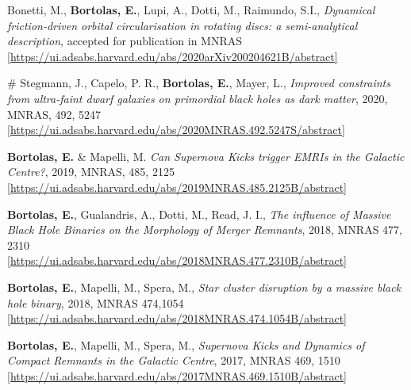 \begin{etaremune}

\item   Bonetti, M., \textbf{Bortolas, E.}, Lupi, A., Dotti, M., Raimundo, S.I., { \it Dynamical friction-driven orbital circularisation in rotating discs: a semi-analytical description}, accepted for publication in MNRAS \\ \href{https://ui.adsabs.harvard.edu/abs/2020arXiv200204621B/abstract}{\scriptsize [https://ui.adsabs.harvard.edu/abs/2020arXiv200204621B/abstract]}

\item  \# Stegmann, J., Capelo, P. R.,  {\bf Bortolas, E.}, Mayer, L., { \it Improved constraints from ultra-faint dwarf galaxies on primordial black holes as dark matter}, 2020, MNRAS, 492, 5247\\ \href{https://ui.adsabs.harvard.edu/abs/2020MNRAS.492.5247S/abstract}{\scriptsize [https://ui.adsabs.harvard.edu/abs/2020MNRAS.492.5247S/abstract]}

\item {\bf Bortolas, E.} \& Mapelli, M. { \it Can Supernova Kicks trigger EMRIs in the Galactic Centre?}, 2019, MNRAS, 485, 2125 \\ \href{https://ui.adsabs.harvard.edu/abs/2019MNRAS.485.2125B/abstract}{\scriptsize [https://ui.adsabs.harvard.edu/abs/2019MNRAS.485.2125B/abstract]}

\item {\bf Bortolas, E.}, Gualandris, A., Dotti, M., Read, J. I., { \it The influence of Massive Black Hole Binaries on the Morphology of Merger Remnants},  2018, MNRAS 477, 2310 \\ \href{https://ui.adsabs.harvard.edu/abs/2018MNRAS.477.2310B/abstract}{\scriptsize [https://ui.adsabs.harvard.edu/abs/2018MNRAS.477.2310B/abstract]}

\item {\bf Bortolas, E.}, Mapelli, M., Spera, M., { \it Star cluster disruption by a massive black hole binary}, 2018, MNRAS 474,1054 \\ \href{https://ui.adsabs.harvard.edu/abs/2018MNRAS.474.1054B/abstract}{\scriptsize [https://ui.adsabs.harvard.edu/abs/2018MNRAS.474.1054B/abstract]}

\item {\bf Bortolas, E.}, Mapelli, M., Spera, M., {\it Supernova Kicks and Dynamics of Compact Remnants in the Galactic Centre}, 2017, MNRAS 469, 1510 \\ \href{https://ui.adsabs.harvard.edu/abs/2017MNRAS.469.1510B/abstract}{\scriptsize [https://ui.adsabs.harvard.edu/abs/2017MNRAS.469.1510B/abstract]} 


\end{etaremune}
